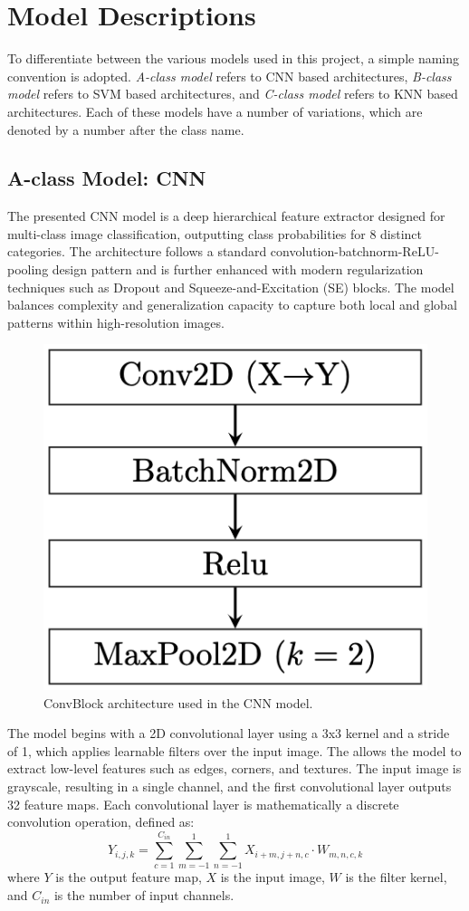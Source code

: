 \documentclass[conference]{IEEEtran}
\begin{document}
\section{Model Descriptions}
To differentiate between the various models used in this project, a simple naming convention is adopted.
\textit{A-class model} refers to CNN based architectures, \textit{B-class model} refers to SVM based architectures, and \textit{C-class model} refers to KNN based architectures.
Each of these models have a number of variations, which are denoted by a number after the class name.

\subsection{A-class Model: CNN}
The presented CNN model is a deep hierarchical feature extractor designed for multi-class image classification, outputting class probabilities for 8 distinct categories. 
The architecture follows a standard convolution-batchnorm-ReLU-pooling design pattern and is further enhanced with modern regularization techniques such as Dropout and Squeeze-and-Excitation (SE) blocks. 
The model balances complexity and generalization capacity to capture both local and global patterns within high-resolution images.

\begin{figure}[h]
    \centering
    \includegraphics[width=0.45\linewidth]{assets/ConvBlock.png}
    \caption{ConvBlock architecture used in the CNN model.}
    \label{fig:conv-block}
\end{figure}

The model begins with a 2D convolutional layer using a 3x3 kernel and a stride of 1, which applies learnable filters over the input image.
The allows the model to extract low-level features such as edges, corners, and textures. 
The input image is grayscale, resulting in a single channel, and the first convolutional layer outputs 32 feature maps.
Each convolutional layer is mathematically a discrete convolution operation, defined as:
\begin{equation}
    Y_{i,j,k} = \sum_{c=1}^{C_{in}} \sum_{m=-1}^{1} \sum_{n=-1}^{1} X_{i+m,j+n,c} \cdot W_{m,n,c,k}
\end{equation}
where \(Y\) is the output feature map, \(X\) is the input image, \(W\) is the filter kernel, and \(C_{in}\) is the number of input channels.
\end{document}
